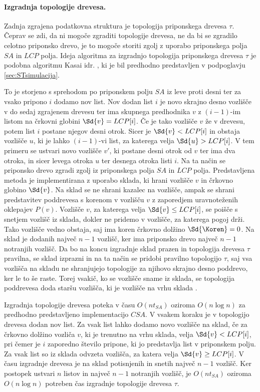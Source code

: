 \paragraph{Izgradnja topologije drevesa.}
Zadnja zgrajena podatkovna struktura je topologija priponskega drevesa $\tau$. Čeprav se zdi, da ni mogoče zgraditi topologije drevesa, ne da bi se zgradilo celotno priponsko drevo, je to mogoče storiti zgolj z uporabo priponskega polja $SA$ in $LCP$ polja. Ideja algoritma za izgradnjo topologija priponskega drevesa $\tau$ je podobna algoritmu Kasai idr. \cite{Kasai2001}, ki je bil predhodno predstavljen v podpoglavju \ref{sec:STsimulacija}.

To je storjeno s sprehodom po priponskem polju $SA$ iz leve proti desni ter za vsako pripono $i$ dodamo nov list. Nov dodan list $i$ je novo skrajno desno vozlišče v do sedaj zgrajenem drevesu ter ima skupnega predhodnika $v$ z $(i-1)$-im listom na črkovni globini $\Sd{v}=LCP[i]$. Če je tako vozlišče $v$ že v drevesu, potem list $i$ postane njegov desni otrok. Sicer je $\Sd{v}<LCP[i]$ in obstaja vozlišče $u$, ki je lahko $(i-1)$-vi list, za katerega velja $\Sd{u}>LCP[i]$. V tem primeru se ustvari novo vozlišče $v'$, ki postane desni otrok od $v$ ter ima dva otroka, in sicer levega otroka $u$ ter desnega otroka listi $i$. Na ta način se priponsko drevo zgradi zgolj iz priponskega polja $SA$ in $LCP$ polja. Predstavljena metoda je implementirana z uporabo sklada, ki hrani vozlišče $v$ in črkovno globino $\Sd{v}$. Na sklad se ne shrani kazalec na vozlišče, ampak se shrani predstavitev poddrevesa s korenom v vozlišču $v$ z zaporedjem uravnoteženih oklepajev $P(v)$. Vozlišče $v$, za katerega velja $\Sd{v}\le LCP[i]$, se poišče s snetjem vozlišč iz sklada, dokler ne pridemo v vozlišče, za katerega pogoj drži. Tako vozlišče vedno obstaja, saj ima koren črkovno dolžino $\Sd{\Koren}=0$. Na sklad je dodanih največ $n-1$ vozlišč, ker ima priponsko drevo največ $n-1$ notranjih vozlišč. Da bo na koncu izgradnje sklad prazen in topologija drevesa $\tau$ pravilna, se sklad izprazni in na ta način se pridobi pravilno topologijo $\tau$, saj vsa vozlišča na skladu ne shranjujejo topologije za njihovo skrajno desno poddrevo, ker le to še raste. Torej vsakič, ko se vozlišče sname iz sklada, se topologija poddrevesa doda staršu vozlišča, ki je vozlišče na vrhu sklada \cite{Navarro2016}.

Izgradnja topologije drevesa poteka v času $O(nt_{SA})$ oziroma $O(n\log{n})$ za predhodno predstavljeno implementacijo $CSA$. V vsakem koraku je v topologijo drevesa dodan nov list. Za vsak list lahko dodamo novo vozlišče na sklad, če za črkovno dolžino vozliča $v$, ki je trenutno na vrhu sklada, velja $\Sd{v}<LCP[i]$, pri čemer je $i$ zaporedno število pripone, ki jo predstavlja list v priponskem polju. Za vsak list so iz sklada odvzeta vozlišča, za katera velja $\Sd{v}\ge LCP[i]$. V času izgradnje drevesa je na sklad potisnjenih in snetih največ $n-1$ vozlišč. Ker postopek ustvari $n$ listov in največ $n-1$ notranjih vozlišč, je $O(nt_{SA})$ oziroma $O(n\log{n})$  potreben čas izgradnje topologije drevesa $\tau$.


